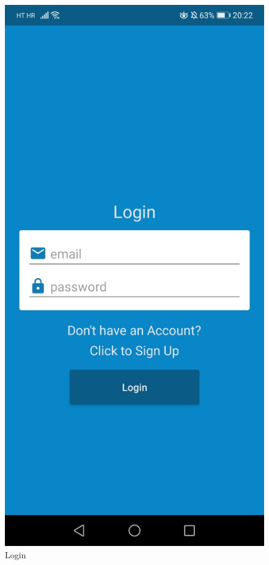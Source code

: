 \documentclass[times, utf8, zavrsni]{fer}
\begin{document}
\begin{figure}[!h]
  \includegraphics[width=1\textwidth]{./slike/app4}
	\caption{Login}
\label{fig:app2}
\endminipage\hfill
{}

\end{figure}
\end{document}
